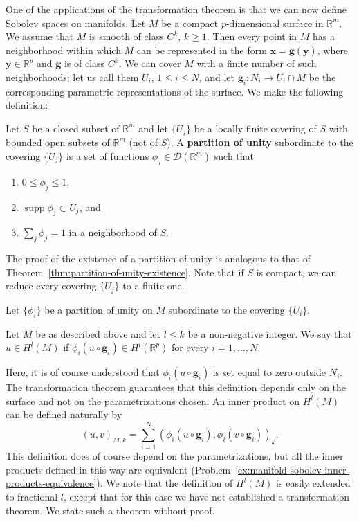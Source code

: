 One of the applications of the transformation theorem is that we can now define Sobolev spaces on manifolds. Let $M$ be a compact $p$-dimensional surface in $\mathbb{R}^m$. We assume that $M$ is smooth of class $C^k$, $k\geq1$. Then every point in $M$ has a neighborhood within which $M$ can be represented in the form $\bm{x}=\bm{g}(\bm{y})$, where $\bm{y}\in\mathbb{R}^p$ and $\bm{g}$ is of class $C^k$. We can cover $M$ with a finite number of such neighborhoods; let us call them $U_i$, $1\leq i\leq N$, and let $\bm{g}_i:N_i\to U_i\cap M$ be the corresponding parametric representations of the surface. We make the following definition:

\begin{Definition}
\label{def:closed-set-partition-of-unity}
Let $S$ be a closed subset of $\mathbb{R}^m$ and let $\{U_j\}$ be a locally finite covering of $S$ with bounded open subsets of $\mathbb{R}^m$ (not of $S$). A \textbf{partition of unity} subordinate to the covering $\{U_j\}$ is a set of functions $\phi_j\in\mathcal{D}(\mathbb{R}^m)$ such that\begin{enumerate}
\item $0\leq\phi_j\leq1$,
\item $\operatorname{supp}\phi_j\subset U_j$, and
\item $\sum_j\phi_j=1$ in a neighborhood of $S$.
\end{enumerate}
\end{Definition}

The proof of the existence of a partition of unity is analogous to that of Theorem~\ref{thm:partition-of-unity-existence}. Note that if $S$ is compact, we can reduce every covering $\{U_j\}$ to a finite one.

Let $\{\phi_i\}$ be a partition of unity on $M$ subordinate to the covering $\{U_i\}$.

\begin{Definition}
\label{def:manifold-sobolev-spaces}
Let $M$ be as described above and let $l\leq k$ be a non-negative integer. We say that $u\in H^l(M)$ if $\phi_i(u\circ\bm{g}_i)\in H^l(\mathbb{R}^p)$ for every $i=1,\ldots,N$.
\end{Definition}

Here, it is of course understood that $\phi_i(u\circ\bm{g}_i)$ is set equal to zero outside $N_i$. The transformation theorem guarantees that this definition depends only on the surface and not on the parametrizations chosen. An inner product on $H^l(M)$ can be defined naturally by
\begin{equation}\label{eq:manifold-sobolev-local-inner-product}
(u,v)_{M,k}=\sum_{i=1}^N(\phi_i(u\circ\bm{g}_i),\phi_i(v\circ\bm{g}_i))_k.
\end{equation}
This definition does of course depend on the parametrizations, but all the inner products defined in this way are equivalent (Problem~\ref{ex:manifold-sobolev-inner-products-equivalence}). We note that the definition of $H^l(M)$ is easily extended to fractional $l$, except that for this case we have not established a transformation theorem. We state such a theorem without proof.

